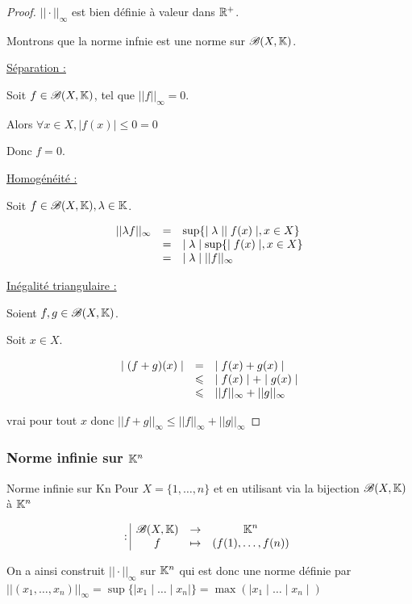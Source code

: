 \begin{proof}
    $|| \cdot ||_\infty$ est bien définie à valeur dans $\mathbb{R}^+$.

    Montrons que la norme infnie est une norme sur $\mathscr B (X, \mathbb{K})$. 

    \quad \underline{Séparation : }

    Soit $f \in \mathscr B(X, \mathbb{K})$, tel que $||f ||_\infty = 0$. 

    Alors $\forall x \in X, \mid f(x) \mid \leqslant 0 = 0$

    Donc $f = 0$. 

    \quad \underline{Homogénéité : }

    Soit $f \in \mathscr B(X, \mathbb{K}), \lambda \in \mathbb{K}$. 

    \[
    \begin{array}{rcl}
        || \lambda f ||_\infty & = & \sup\{\mid \lambda \mid \mid f(x) \mid, x \in X\} \\
        \space & = & \mid \lambda \mid \sup \{ \mid f(x) \mid , x \in X\} \\
        \space & = & \mid \lambda \mid ||f ||_\infty \\
    \end{array}
    \]

    \quad \underline{Inégalité triangulaire : }

    Soient $f, g \in \mathscr B(X, \mathbb{K})$. 

    Soit $x \in X$. 

    \[
    \begin{array}{rcl}
        \mid (f + g)(x) \mid & = & \mid f(x) + g(x) \mid \\
        \space & \leqslant & \mid f(x) \mid + \mid g(x) \mid \\
        \space & \leqslant & ||f||_\infty + ||g ||_\infty \\
    \end{array}
    \]

    vrai pour tout $x$ donc $|| f + g||_\infty \leqslant ||f||_\infty + ||g||_\infty$
\end{proof}

\subsubsection{Norme infinie sur \texorpdfstring{$\mathbb{K}^n$}{kn}}

\begin{definition}{Norme infinie sur Kn}{}
    Pour $X = \{1, \dots, n\}$ et en utilisant via la bijection $\mathscr B(X, \mathbb{K})$
    à $\mathbb{K}^n$ 

    $$: \space \begin{array}{|ccc} \displaystyle \mathscr B(X, \mathbb{K}) & \to & \displaystyle \mathbb{K}^n \\ \displaystyle f & \mapsto & \displaystyle (f(1), \dots, f(n)) \end{array}$$

    On a ainsi construit $|| \cdot ||_\infty$ sur $\mathbb{K}^n$ qui est donc une norme définie
    par $||(x_1, \dots, x_n)||_\infty = \sup\{\mid x_1\mid \dots \mid x_n \mid \} = \max (\mid x_1\mid \dots \mid x_n \mid)$
\end{definition}


